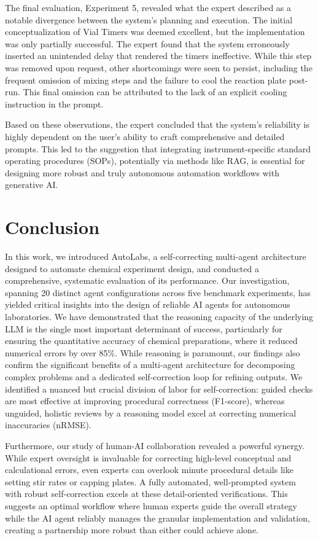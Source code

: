 \documentclass[sn-nature, twocolumn]{sn-jnl}%
\theoremstyle{thmstyleone}%
\theoremstyle{thmstyletwo}%
\theoremstyle{thmstylethree}%
\begin{document}
The final evaluation, Experiment 5, revealed what the expert described as a notable divergence between the system's planning and execution. The initial conceptualization of Vial Timers was deemed excellent, but the implementation was only partially successful. The expert found that the system erroneously inserted an unintended delay that rendered the timers ineffective. While this step was removed upon request, other shortcomings were seen to persist, including the frequent omission of mixing steps and the failure to cool the reaction plate post-run. This final omission can be attributed to the lack of an explicit cooling instruction in the prompt.

Based on these observations, the expert concluded that the system's reliability is highly dependent on the user's ability to craft comprehensive and detailed prompts. This led to the suggestion that integrating instrument-specific standard operating procedures (SOPs), potentially via methods like RAG, is essential for designing more robust and truly autonomous automation workflows with generative AI.




\section{Conclusion}

In this work, we introduced AutoLabs, a self-correcting multi-agent architecture designed to automate chemical experiment design, and conducted a comprehensive, systematic evaluation of its performance. Our investigation, spanning 20 distinct agent configurations across five benchmark experiments, has yielded critical insights into the design of reliable AI agents for autonomous laboratories. We have demonstrated that the reasoning capacity of the underlying LLM is the single most important determinant of success, particularly for ensuring the quantitative accuracy of chemical preparations, where it reduced numerical errors by over 85\%. While reasoning is paramount, our findings also confirm the significant benefits of a multi-agent architecture for decomposing complex problems and a dedicated self-correction loop for refining outputs. We identified a nuanced but crucial division of labor for self-correction: guided checks are most effective at improving procedural correctness (F1-score), whereas unguided, holistic reviews by a reasoning model excel at correcting numerical inaccuracies (nRMSE).

Furthermore, our study of human-AI collaboration revealed a powerful synergy. While expert oversight is invaluable for correcting high-level conceptual and calculational errors, even experts can overlook minute procedural details like setting stir rates or capping plates. A fully automated, well-prompted system with robust self-correction excels at these detail-oriented verifications. This suggests an optimal workflow where human experts guide the overall strategy while the AI agent reliably manages the granular implementation and validation, creating a partnership more robust than either could achieve alone.
\end{document}

